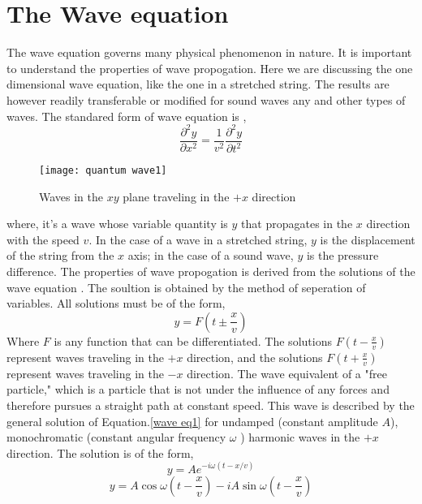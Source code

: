 \section{The Wave equation}
The wave equation governs many physical phenomenon in nature. It is important to  understand the properties of wave propogation. Here we are discussing the one dimensional wave equation, like the one in a stretched string. The results are however readily transferable or modified for sound waves any and other types of waves.
The standared form of wave equation is ,
\begin{equation}\label{wave eq1}
\frac{\partial^{2} y}{\partial x^{2}}=\frac{1}{v^{2}} \frac{\partial^{2} y}{\partial t^{2}}
\end{equation}
\begin{figure}[H]
	\centering
	\texttt{[image: quantum wave1]}
	\caption{Waves in the $x y$ plane traveling in the $+x$ direction }
	\label{quantum wave1}
\end{figure}
where, it's  a wave whose variable quantity is $y$ that propagates in the $x$ direction with the speed $v$. In the case of a wave in a stretched string, $y$ is the displacement of the string from the $x$ axis; in the case of a sound wave, $y$ is the pressure difference. The properties of wave propogation is derived from the solutions of the wave equation . The soultion is obtained by the method of seperation of variables. All solutions must be of the form,
\begin{equation}\label{wave eq2}
y=F\left(t \pm \frac{x}{v}\right)
\end{equation}
Where $ F $ is any function that can be differentiated. The solutions $F(t-\frac{x}{v})$ represent waves traveling in the $+x$ direction, and the solutions $F(t+\frac{x}{v})$ represent waves traveling in the $-x$ direction. 
The wave equivalent of a "free particle," which is a particle that is not under the influence of any forces and therefore pursues a straight path at constant speed. This wave is described by the general solution of Equation.\ref*{wave eq1} for undamped (constant amplitude $ A $), monochromatic (constant angular frequency $\omega$ ) harmonic waves in the $+x$ direction. The solution is of the form,
\begin{equation}\label{wave eq3}
y=A e^{-i \omega(t-x / v)}
\end{equation}
\begin{equation}\label{wave eq4}
y=A \cos \omega\left(t-\frac{x}{v}\right)-i A \sin \omega\left(t-\frac{x}{v}\right)
\end{equation}

